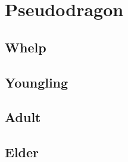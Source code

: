 \section{Pseudodragon}

\subsection{Whelp}

\subsection{Youngling}

\subsection{Adult}

\subsection{Elder}